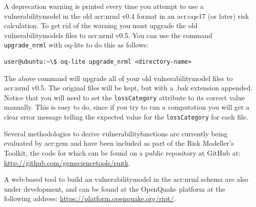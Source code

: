 A deprecation warning is printed every time you attempt to use a
\gls{vulnerabilitymodel} in the old \gls{acr:nrml} v0.4 format in an
\gls{acr:oqe17} (or later) risk calculation. To get rid of the warning you
must upgrade the old \glspl{vulnerabilitymodel} files to \gls{acr:nrml} v0.5.
You can use the command \Verb+upgrade_nrml+ with oq-lite to do this as
follows:

\begin{verbatim}
user@ubuntu:~\$ oq-lite upgrade_nrml <directory-name>
\end{verbatim}

The above command will upgrade all of your old \gls{vulnerabilitymodel} files to
\gls{acr:nrml} v0.5. The original files will be kept, but with a .bak extension
appended. Notice that you will need to set the \Verb+lossCategory+ attribute
to its correct value manually. This is easy to do, since if you try to run a
computation you will get a clear error message telling the expected value for
the \Verb+lossCategory+ for each file.


Several methodologies to derive \glspl{vulnerabilityfunction} are currently being
evaluated by \gls{acr:gem} and have been included as part of the Risk
Modeller's Toolkit, the code for which can be found on a public repository at
GitHub at: 
\href{http://github.com/gemsciencetools/rmtk}{http://github.com/gemsciencetools/rmtk}.

A web-based tool to build an \gls{vulnerabilitymodel} in the \gls{acr:nrml} schema
are also under development, and can be found at the OpenQuake platform at the
following address: \href{https://platform.openquake.org/ript/}{https://platform.openquake.org/ript/}.
